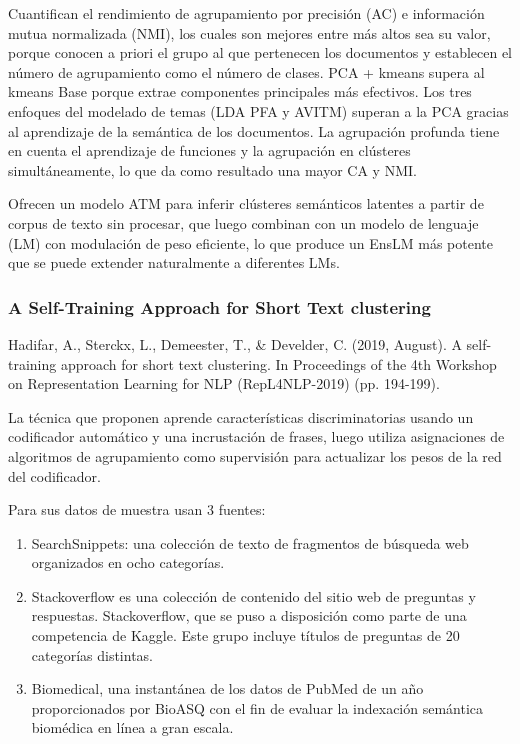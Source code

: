 \documentclass[12pt]{article}
\begin{document}
			Cuantifican el rendimiento de agrupamiento por precisión (AC) e información mutua normalizada (NMI), los cuales son mejores entre más altos sea su valor, porque conocen a priori el grupo al que pertenecen los documentos y establecen el número de agrupamiento como el número de clases. PCA + kmeans supera al kmeans Base porque extrae componentes principales más efectivos. Los tres enfoques del modelado de temas (LDA PFA y AVITM) superan a la PCA gracias al aprendizaje de la semántica de los documentos. La agrupación profunda tiene en cuenta el aprendizaje de funciones y la agrupación en clústeres simultáneamente, lo que da como resultado una mayor CA y NMI.
			
			Ofrecen un modelo ATM para inferir clústeres semánticos latentes a partir de corpus de texto sin procesar, que luego combinan con un modelo de lenguaje (LM) con modulación de peso eficiente, lo que produce un EnsLM más potente que se puede extender naturalmente a diferentes LMs.
						
			
			\subsubsection{A Self-Training Approach for Short Text clustering}
			Hadifar, A., Sterckx, L., Demeester, T., \& Develder, C. (2019, August). A self-training approach for short text clustering. In Proceedings of the 4th Workshop on Representation Learning for NLP (RepL4NLP-2019) (pp. 194-199).
			
			La técnica que proponen aprende características discriminatorias usando un codificador automático y una incrustación de frases, luego utiliza asignaciones de algoritmos de agrupamiento como supervisión para actualizar los pesos de la red del codificador.
			
			Para sus datos de muestra usan 3 fuentes:
			\begin{enumerate}
				\item SearchSnippets: una colección de texto de fragmentos de búsqueda web organizados en ocho categorías.
				
				\item Stackoverflow es una colección de contenido del sitio web de preguntas y respuestas. Stackoverflow, que se puso a disposición como parte de una competencia de Kaggle. Este grupo incluye títulos de preguntas de 20 categorías distintas.
				
				\item Biomedical, una instantánea de los datos de PubMed de un año proporcionados por BioASQ con el fin de evaluar la indexación semántica biomédica en línea a gran escala.
																
			\end{enumerate}
			    
\end{document}
